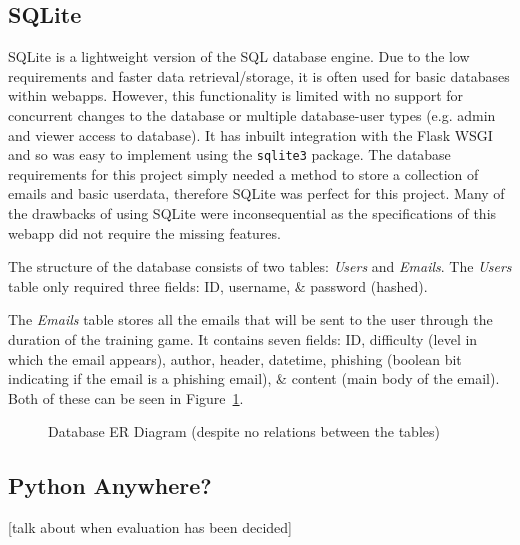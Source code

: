 \documentclass{l4proj}
\begin{document}
\subsection{SQLite}
SQLite is a lightweight version of the SQL database engine. Due to the low requirements and faster data retrieval/storage, it is often used for basic databases within webapps. However, this functionality is limited with no support for concurrent changes to the database or multiple database-user types (e.g. admin and viewer access to database). It has inbuilt integration with the Flask WSGI and so was easy to implement using the \verb|sqlite3| package. The database requirements for this project simply needed a method to store a collection of emails and basic userdata, therefore SQLite was perfect for this project. Many of the drawbacks of using SQLite were inconsequential as the specifications of this webapp did not require the missing features.

The structure of the database consists of two tables: \textit{Users} and \textit{Emails}. The \textit{Users} table only required three fields: ID, username, & password (hashed).

The \textit{Emails} table stores all the emails that will be sent to the user through the duration of the training game. It contains seven fields: ID, difficulty (level in which the email appears), author, header, datetime, phishing (boolean bit indicating if the email is a phishing email), & content (main body of the email). Both of these can be seen in Figure~\ref{fig:database}. 

\begin{figure}[H]
    \centering
    \caption{Database ER Diagram (despite no relations between the tables)}
    \label{fig:database} 
\end{figure}


\subsection{Python Anywhere?}
[talk about when evaluation has been decided]
\end{document}
